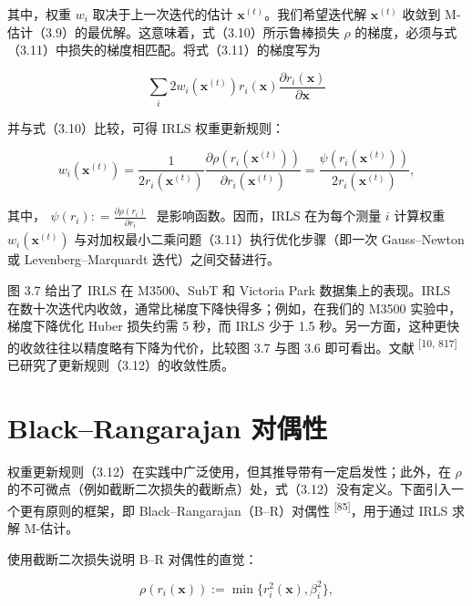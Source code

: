 其中，权重 $w _ { i }$ 取决于上一次迭代的估计 $\mathbf { \boldsymbol { x } } ^ { ( t ) }$。我们希望迭代解 $\mathbf { \boldsymbol { x } } ^ { ( t ) }$ 收敛到 M-估计（3.9）的最优解。这意味着，式（3.10）所示鲁棒损失 $\rho$ 的梯度，必须与式（3.11）中损失的梯度相匹配。将式（3.11）的梯度写为

\begin{equation*}
\sum_ {i} 2 w _ {i} (\boldsymbol {x} ^ {(t)}) r _ {i} (\boldsymbol {x}) \frac {\partial r _ {i} (\boldsymbol {x})}{\partial \boldsymbol {x}}
\end{equation*}

并与式（3.10）比较，可得 IRLS 权重更新规则：

\begin{equation}
w _ {i} (\pmb {x} ^ {(t)}) = \frac {1}{2 r _ {i} (\pmb {x} ^ {(t)})} \frac {\partial \rho (r _ {i} (\pmb {x} ^ {(t)}))}{\partial r _ {i} (\pmb {x} ^ {(t)})} = \frac {\psi (r _ {i} (\pmb {x} ^ {(t)}))}{2 r _ {i} (\pmb {x} ^ {(t)})},\tag{3.12}
\end{equation}

其中，$\begin{array} { r } { \psi ( r _ { i } ) : = \frac { \partial \rho ( r _ { i } ) } { \partial r _ { i } } } \end{array}$ 是影响函数。因而，IRLS 在为每个测量 $i$ 计算权重 $w _ { i } ( \pmb { x } ^ { ( t ) } )$ 与对加权最小二乘问题（3.11）执行优化步骤（即一次 Gauss–Newton 或 Levenberg–Marquardt 迭代）之间交替进行。

图 3.7 给出了 IRLS 在 M3500、SubT 和 Victoria Park 数据集上的表现。IRLS 在数十次迭代内收敛，通常比梯度下降快得多；例如，在我们的 M3500 实验中，梯度下降优化 Huber 损失约需 5 秒，而 IRLS 少于 1.5 秒。另一方面，这种更快的收敛往往以精度略有下降为代价，比较图 3.7 与图 3.6 即可看出。文献 \textsuperscript{[10, 817]} 已研究了更新规则（3.12）的收敛性质。

\section{Black–Rangarajan 对偶性}

权重更新规则（3.12）在实践中广泛使用，但其推导带有一定启发性；此外，在 $\rho$ 的不可微点（例如截断二次损失的截断点）处，式（3.12）没有定义。下面引入一个更有原则的框架，即 Black–Rangarajan（B–R）对偶性 \textsuperscript{[85]}，用于通过 IRLS 求解 M-估计。

使用截断二次损失说明 B–R 对偶性的直觉：

\begin{equation}
\rho (r _ {i} (\boldsymbol {x})) := \min \{r _ {i} ^ {2} (\boldsymbol {x}), \beta_ {i} ^ {2} \},\tag{3.13}
\end{equation}


